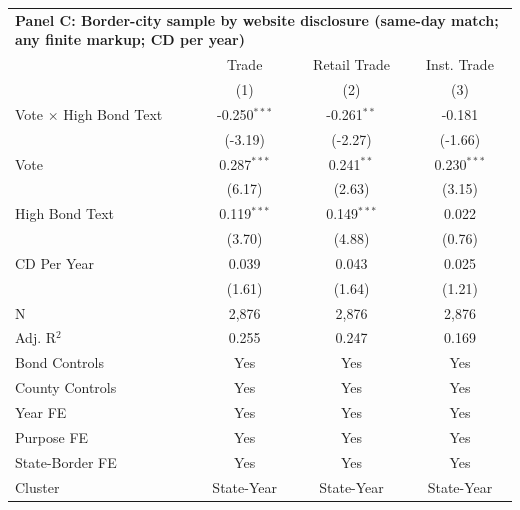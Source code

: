 \begingroup
\centering
\begin{tabular*}{\textwidth}{@{\extracolsep{\fill}}lccc}
\multicolumn{5}{l}{\textbf{Panel C: Border-city sample by website disclosure (same-day match; any finite markup; CD per year)}}\\

\addlinespace
   \toprule
                                 & Trade          & Retail Trade  & Inst. Trade\\  
                                 & (1)            & (2)           & (3)\\  
   \midrule 
   Vote $\times$ High Bond Text  & -0.250$^{***}$ & -0.261$^{**}$ & -0.181\\   
                                 & (-3.19)       & (-2.27)      & (-1.66)\\   
   Vote                          & 0.287$^{***}$  & 0.241$^{**}$  & 0.230$^{***}$\\   
                                 & (6.17)        & (2.63)       & (3.15)\\   
   High Bond Text                & 0.119$^{***}$  & 0.149$^{***}$ & 0.022\\   
                                 & (3.70)        & (4.88)       & (0.76)\\   
   CD Per Year                   & 0.039          & 0.043         & 0.025\\   
                                 & (1.61)        & (1.64)       & (1.21)\\   
   \hline
   N                  & 2,876          & 2,876         & 2,876\\  
   Adj. R$^2$                & 0.255          & 0.247         & 0.169\\  
   Bond Controls                 & Yes            & Yes           & Yes\\  
   County Controls               & Yes            & Yes           & Yes\\  
   Year FE                       & Yes            & Yes           & Yes\\  
   Purpose FE                    & Yes            & Yes           & Yes\\  
   State-Border FE               & Yes            & Yes           & Yes\\  
   Cluster              & State-Year & State-Year & State-Year\\  
   \bottomrule
\end{tabular*}
\par\endgroup

